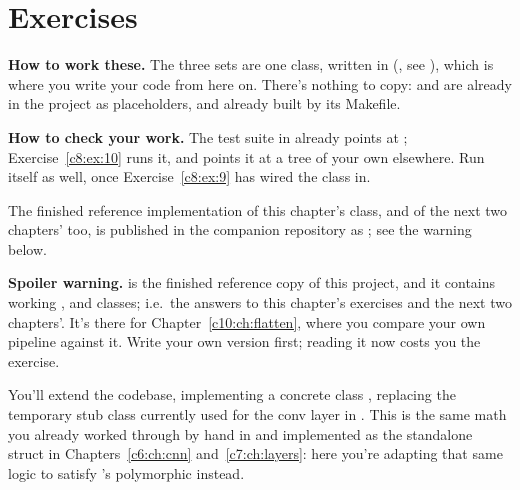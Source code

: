 
\section{Exercises}
\label{c8:sec:exercises}\label{c8:app:a}

\begin{aside}
\textbf{How to work these.} The three sets are one class, written in 
(, see ), which is where you write your code
from here on. There's nothing to copy:  and  are already in the
project as placeholders, and already built by its Makefile.

\textbf{How to check your work.} The test suite in 
already points at ; Exercise~\ref{c8:ex:10} runs it, and 
points it at a tree of your own elsewhere. Run  itself as well, once
Exercise~\ref{c8:ex:9} has wired the class in.

The finished reference implementation of this chapter's class, and of the next two chapters' too,
is published in the companion repository as ; see the warning below.
\end{aside}

\begin{warning}
\textbf{Spoiler warning.}  is the finished reference copy of this
project, and it contains working ,  and  classes; i.e.\ the
answers to this chapter's exercises and the next two chapters'. It's there for
Chapter~\ref{c10:ch:flatten}, where you compare your own pipeline against it. Write your own
version first; reading it now costs you the exercise.
\end{warning}

\label{c8:set:1}
You'll extend the  codebase, implementing a concrete class , replacing the
temporary stub class  currently used for the conv layer in
. This is the same math you already worked through by hand in
 and implemented as the standalone struct  in
Chapters~\ref{c6:ch:cnn} and~\ref{c7:ch:layers}: here you're adapting that same logic to satisfy
's polymorphic  instead.

